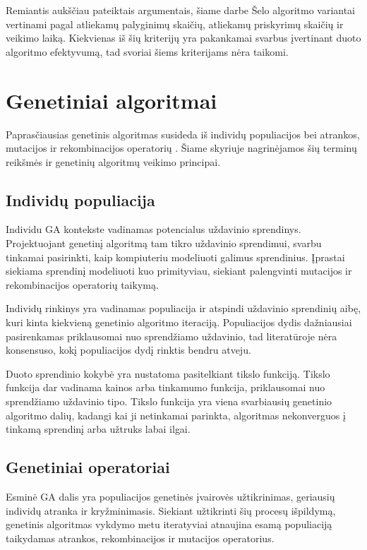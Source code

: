 \documentclass{VUMIFInfBakalaurinis}
\begin{document}
Remiantis aukščiau pateiktais argumentais, šiame darbe Šelo algoritmo variantai vertinami pagal
atliekamų palyginimų skaičių, atliekamų priskyrimų skaičių ir veikimo laiką.
Kiekvienas iš šių kriterijų yra pakankamai svarbus įvertinant duoto algoritmo efektyvumą, tad svoriai šiems kriterijams nėra taikomi.

\section{Genetiniai algoritmai}

Paprasčiausias genetinis algoritmas susideda iš individų populiacijos bei atrankos, mutacijos ir rekombinacijos operatorių \cite{simpson1999faster}.
Šiame skyriuje nagrinėjamos šių terminų reikšmės ir genetinių algoritmų veikimo principai.

\subsection{Individų populiacija}

Individu GA kontekste vadinamas potencialus uždavinio sprendinys.
Projektuojant genetinį algoritmą tam tikro uždavinio sprendimui, svarbu tinkamai pasirinkti,
kaip kompiuteriu modeliuoti galimus sprendinius.
Įprastai siekiama sprendinį modeliuoti kuo primityviau, siekiant
palengvinti mutacijos ir rekombinacijos operatorių taikymą.

Individų rinkinys yra vadinamas populiacija ir atspindi uždavinio sprendinių aibę, kuri kinta kiekvieną genetinio algoritmo iteraciją.
Populiacijos dydis dažniausiai pasirenkamas priklausomai nuo sprendžiamo uždavinio,
tad literatūroje nėra konsensuso, kokį populiacijos dydį rinktis bendru atveju.

Duoto sprendinio kokybė yra nustatoma pasitelkiant tikslo funkciją.
Tikslo funkcija dar vadinama kainos arba tinkamumo funkcija, priklausomai nuo sprendžiamo uždavinio tipo.
Tikslo funkcija yra viena svarbiausių genetinio algoritmo dalių,
kadangi kai ji netinkamai parinkta, algoritmas nekonverguos į tinkamą sprendinį arba užtruks labai ilgai.

\subsection{Genetiniai operatoriai}

Esminė GA dalis yra populiacijos genetinės įvairovės užtikrinimas, geriausių individų atranka ir kryžminimasis.
Siekiant užtikrinti šių procesų išpildymą, genetinis algoritmas vykdymo metu
iteratyviai atnaujina esamą populiaciją taikydamas atrankos, rekombinacijos ir mutacijos operatorius.
\end{document}
